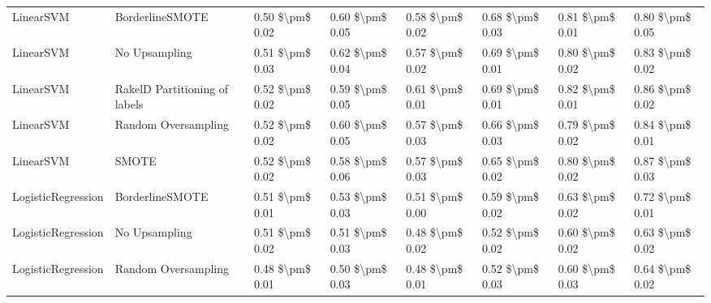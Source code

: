 \begin{tabular}{llllllll}
                      LinearSVM &               BorderlineSMOTE &     0.50 \$\textbackslash pm\$ 0.02 &           0.60 \$\textbackslash pm\$ 0.05 &       0.58 \$\textbackslash pm\$ 0.02 &        0.68 \$\textbackslash pm\$ 0.03 &                         0.81 \$\textbackslash pm\$ 0.01 & 0.80 \$\textbackslash pm\$ 0.05 \\
                      LinearSVM &                 No Upsampling &     0.51 \$\textbackslash pm\$ 0.03 &           0.62 \$\textbackslash pm\$ 0.04 &       0.57 \$\textbackslash pm\$ 0.02 &        0.69 \$\textbackslash pm\$ 0.01 &                         0.80 \$\textbackslash pm\$ 0.02 & 0.83 \$\textbackslash pm\$ 0.02 \\
                      LinearSVM & RakelD Partitioning of labels &     0.52 \$\textbackslash pm\$ 0.02 &           0.59 \$\textbackslash pm\$ 0.05 &       0.61 \$\textbackslash pm\$ 0.01 &        0.69 \$\textbackslash pm\$ 0.01 &                         0.82 \$\textbackslash pm\$ 0.01 & 0.86 \$\textbackslash pm\$ 0.02 \\
                      LinearSVM &           Random Oversampling &     0.52 \$\textbackslash pm\$ 0.02 &           0.60 \$\textbackslash pm\$ 0.05 &       0.57 \$\textbackslash pm\$ 0.03 &        0.66 \$\textbackslash pm\$ 0.03 &                         0.79 \$\textbackslash pm\$ 0.02 & 0.84 \$\textbackslash pm\$ 0.01 \\
                      LinearSVM &                         SMOTE &     0.52 \$\textbackslash pm\$ 0.02 &           0.58 \$\textbackslash pm\$ 0.06 &       0.57 \$\textbackslash pm\$ 0.03 &        0.65 \$\textbackslash pm\$ 0.02 &                         0.80 \$\textbackslash pm\$ 0.02 & 0.87 \$\textbackslash pm\$ 0.03 \\
             LogisticRegression &               BorderlineSMOTE &     0.51 \$\textbackslash pm\$ 0.01 &           0.53 \$\textbackslash pm\$ 0.03 &       0.51 \$\textbackslash pm\$ 0.00 &        0.59 \$\textbackslash pm\$ 0.02 &                         0.63 \$\textbackslash pm\$ 0.02 & 0.72 \$\textbackslash pm\$ 0.01 \\
             LogisticRegression &                 No Upsampling &     0.51 \$\textbackslash pm\$ 0.02 &           0.51 \$\textbackslash pm\$ 0.03 &       0.48 \$\textbackslash pm\$ 0.02 &        0.52 \$\textbackslash pm\$ 0.02 &                         0.60 \$\textbackslash pm\$ 0.02 & 0.63 \$\textbackslash pm\$ 0.02 \\
             LogisticRegression &           Random Oversampling &     0.48 \$\textbackslash pm\$ 0.01 &           0.50 \$\textbackslash pm\$ 0.03 &       0.48 \$\textbackslash pm\$ 0.01 &        0.52 \$\textbackslash pm\$ 0.03 &                         0.60 \$\textbackslash pm\$ 0.03 & 0.64 \$\textbackslash pm\$ 0.02 \\

\end{tabular}
